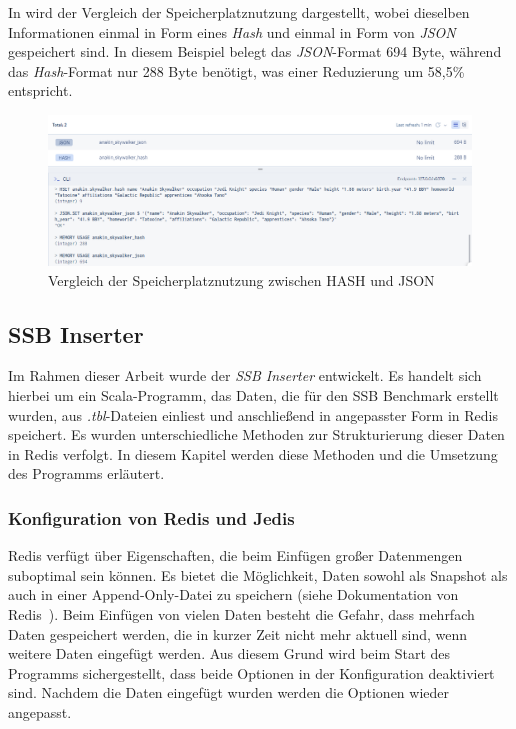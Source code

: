 In  wird der Vergleich der Speicherplatznutzung dargestellt, wobei dieselben Informationen einmal in Form eines \emph{Hash} und einmal in Form von \emph{JSON} gespeichert sind. In diesem Beispiel belegt das \emph{JSON}-Format 694 Byte, während das \emph{Hash}-Format nur 288 Byte benötigt, was einer Reduzierung um 58,5\% entspricht.
\begin{figure}[!h]  %
    \centering
    \includegraphics[width=1\textwidth]{pictures/redis/redis_hash_vs_json_memory.png}
    \caption{Vergleich der Speicherplatznutzung zwischen HASH und JSON}
    \label{pic:redis-hash-vs-json-memory}
\end{figure}

\subsection{SSB Inserter}\label{sec:ssb-inserter}
Im Rahmen dieser Arbeit wurde der \emph{SSB Inserter} entwickelt. Es handelt sich hierbei um ein Scala-Programm, das Daten, die für den SSB Benchmark erstellt wurden, aus \emph{.tbl}-Dateien einliest und anschließend in angepasster Form in Redis speichert. Es wurden unterschiedliche Methoden zur Strukturierung dieser Daten in Redis verfolgt. In diesem Kapitel werden diese Methoden und die Umsetzung des Programms erläutert.

\subsubsection{Konfiguration von Redis und Jedis}
Redis verfügt über Eigenschaften, die beim Einfügen großer Datenmengen suboptimal sein können.
Es bietet die Möglichkeit, Daten sowohl als Snapshot als auch in einer Append-Only-Datei zu speichern (siehe Dokumentation von Redis~\cite{redis_ltd_persistence_nodate}).
Beim Einfügen von vielen Daten besteht die Gefahr, dass mehrfach Daten gespeichert werden, die in kurzer Zeit nicht mehr aktuell sind, wenn weitere Daten eingefügt werden. Aus diesem Grund wird beim Start des Programms sichergestellt, dass beide Optionen in der Konfiguration deaktiviert sind. Nachdem die Daten eingefügt wurden werden die Optionen wieder angepasst. 

